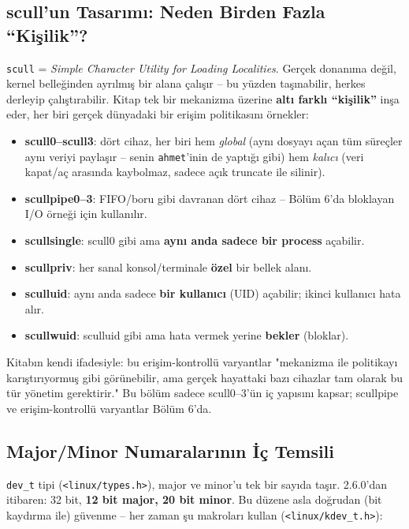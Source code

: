 \documentclass[11pt,a4paper]{article}
\begin{document}
\subsection{scull'un Tasar\i m\i : Neden Birden Fazla ``Ki\c{s}ilik''?}

\texttt{scull} = \emph{Simple Character Utility for Loading Localities}.
Gerçek donanıma değil, kernel belleğinden ayrılmış bir alana çalışır --
bu yüzden taşınabilir, herkes derleyip çalıştırabilir. Kitap tek bir
mekanizma üzerine \textbf{altı farklı ``kişilik''} inşa eder, her biri
gerçek dünyadaki bir erişim politikasını örnekler:

\begin{itemize}[leftmargin=1.2cm]
  \item \textbf{scull0--scull3}: dört cihaz, her biri hem
  \emph{global} (aynı dosyayı açan tüm süreçler aynı veriyi paylaşır --
  senin \texttt{ahmet}'inin de yaptığı gibi) hem \emph{kalıcı} (veri
  kapat/aç arasında kaybolmaz, sadece açık truncate ile silinir).
  \item \textbf{scullpipe0--3}: FIFO/boru gibi davranan dört cihaz --
  Bölüm 6'da bloklayan I/O örneği için kullanılır.
  \item \textbf{scullsingle}: scull0 gibi ama \textbf{aynı anda sadece
  bir process} açabilir.
  \item \textbf{scullpriv}: her sanal konsol/terminale \textbf{özel}
  bir bellek alanı.
  \item \textbf{sculluid}: aynı anda sadece \textbf{bir kullanıcı}
  (UID) açabilir; ikinci kullanıcı hata alır.
  \item \textbf{scullwuid}: sculluid gibi ama hata vermek yerine
  \textbf{bekler} (bloklar).
\end{itemize}

Kitabın kendi ifadesiyle: bu erişim-kontrollü varyantlar "mekanizma ile
politikayı karıştırıyormuş gibi görünebilir, ama gerçek hayattaki bazı
cihazlar tam olarak bu tür yönetim gerektirir." Bu bölüm sadece
scull0--3'ün iç yapısını kapsar; scullpipe ve erişim-kontrollü
varyantlar Bölüm 6'da.

\subsection{Major/Minor Numaralar\i n\i n \.{I}\c{c} Temsili}

\texttt{dev\_t} tipi (\texttt{<linux/types.h>}), major ve minor'u tek
bir sayıda taşır. 2.6.0'dan itibaren: 32 bit, \textbf{12 bit major, 20
bit minor}. Bu düzene asla doğrudan (bit kaydırma ile) güvenme --
her zaman şu makroları kullan (\texttt{<linux/kdev\_t.h>}):
\end{document}
